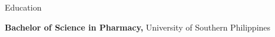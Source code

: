 
\begin{rubric}{\faGraduationCap[solid] Education}

\entry*[2013 -- 2015][]%
	\textbf{Bachelor of Science in Pharmacy,} University of Southern Philippines 
% 
\end{rubric}